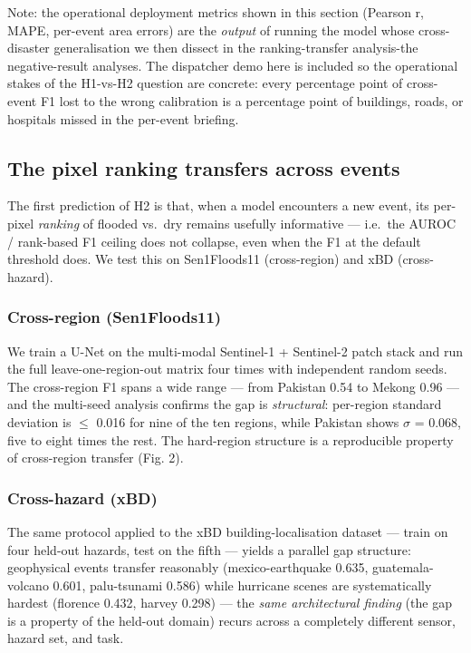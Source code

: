 Note: the operational deployment metrics shown in this section
(Pearson r, MAPE, per-event area errors) are the \emph{output} of running
the model whose cross-disaster generalisation we then dissect in the ranking-transfer analysis-the negative-result analyses.
The dispatcher demo here is included so the operational stakes of the
H1-vs-H2 question are concrete: every percentage point of cross-event
F1 lost to the wrong calibration is a percentage point of buildings,
roads, or hospitals missed in the per-event briefing.

\subsection{The pixel ranking transfers across events}\label{the-pixel-ranking-transfers-across-events}

The first prediction of H2 is that, when a model encounters a new event,
its per-pixel \emph{ranking} of flooded vs.~dry remains usefully informative ---
i.e.~the AUROC / rank-based F1 ceiling does not collapse, even when the
F1 at the default threshold does. We test this on Sen1Floods11
(cross-region) and xBD (cross-hazard).

\subsubsection{Cross-region (Sen1Floods11)}\label{cross-region-sen1floods11}

We train a U-Net on the multi-modal Sentinel-1 + Sentinel-2 patch stack and
run the full leave-one-region-out matrix four times with independent random
seeds. The cross-region F1 spans a wide range --- from Pakistan 0.54 to Mekong
0.96 --- and the multi-seed analysis confirms the gap is \emph{structural}: per-region
standard deviation is $\leq$ 0.016 for nine of the ten regions, while Pakistan
shows $\sigma$ = 0.068, five to eight times the rest. The hard-region structure is a
reproducible property of cross-region transfer (Fig. 2).

\subsubsection{Cross-hazard (xBD)}\label{cross-hazard-xbd}

The same protocol applied to the xBD building-localisation dataset --- train on
four held-out hazards, test on the fifth --- yields a parallel gap structure:
geophysical events transfer reasonably (mexico-earthquake 0.635, guatemala-
volcano 0.601, palu-tsunami 0.586) while hurricane scenes are systematically
hardest (florence 0.432, harvey 0.298) --- the \emph{same architectural finding} (the
gap is a property of the held-out domain) recurs across a completely different
sensor, hazard set, and task.

